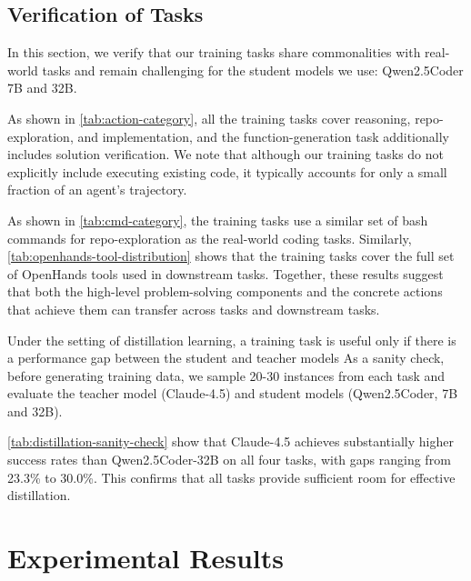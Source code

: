 \documentclass{article}
\theoremstyle{plain}
\theoremstyle{definition}
\theoremstyle{remark}
\begin{document}
\subsection{Verification of \methodName Tasks}
\label{sec:task-verification}
In this section, we verify that our training tasks share commonalities with real-world tasks and remain challenging for the student models we use: Qwen2.5Coder 7B and 32B.

As shown in \autoref{tab:action-category}, all the training tasks cover reasoning, repo-exploration, and implementation, and the function-generation task additionally includes solution verification.
We note that although our training tasks do not explicitly include executing existing code, it typically accounts for only a small fraction of an agent's trajectory.

As shown in \autoref{tab:cmd-category}, the training tasks use a similar set of bash commands for repo-exploration as the real-world coding tasks.
Similarly, \autoref{tab:openhands-tool-distribution} shows that the training tasks cover the full set of OpenHands tools used in downstream tasks.
Together, these results suggest that both the high-level problem-solving components and the concrete actions that achieve them can transfer across \methodName tasks and downstream tasks.


Under the setting of distillation learning, a training task is useful only if there is a performance gap between the student and teacher models
As a sanity check, before generating training data, we sample 20-30 instances from each task and evaluate the teacher model (Claude-4.5) and student models (Qwen2.5Coder, 7B and 32B).

\autoref{tab:distillation-sanity-check} show that Claude-4.5 achieves substantially higher success rates than Qwen2.5Coder-32B on all four tasks, with gaps ranging from 23.3\% to 30.0\%. This confirms that all tasks provide sufficient room for effective distillation.







\section{Experimental Results}
\label{sec:exp}
\end{document}
